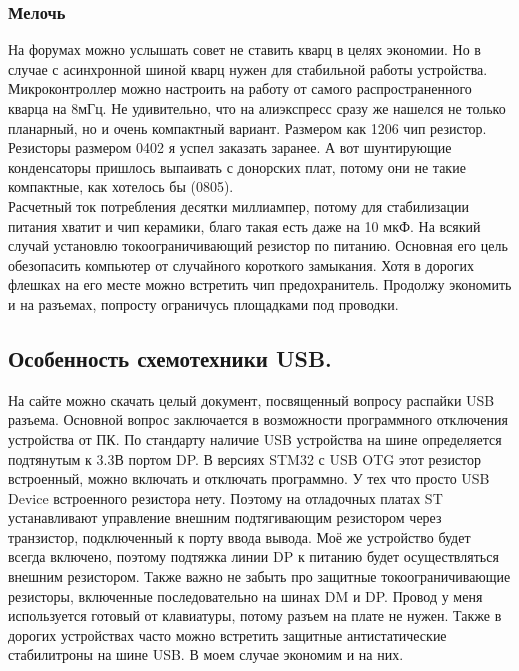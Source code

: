 \documentclass[12pt,a4paper]{article}
\begin{document}
\subsubsection{Мелочь}
    На форумах можно услышать совет не ставить кварц в целях экономии. Но
    в случае с асинхронной шиной кварц нужен для
    стабильной работы устройства. Микроконтроллер можно настроить на работу от
    самого распространенного кварца на 8мГц. Не удивительно, что на алиэкспресс
    сразу же нашелся не только планарный, но и очень компактный вариант.
    Размером как 1206 чип резистор. \\
    Резисторы размером 0402 я успел заказать заранее. А вот шунтирующие
    конденсаторы пришлось выпаивать с донорских плат, потому они не такие
    компактные, как хотелось бы (0805). \\
    Расчетный ток потребления десятки миллиампер, потому для стабилизации
    питания хватит и чип керамики, благо такая есть даже на 10 мкФ.
    На всякий случай установлю токоограничивающий резистор по питанию.
    Основная его цель обезопасить компьютер от случайного короткого замыкания.
    Хотя в дорогих флешках на его месте можно встретить чип предохранитель.
    Продолжу экономить и на разъемах, попросту ограничусь площадками под
    проводки.

\subsection{Особенность схемотехники USB.}
    На сайте можно скачать целый документ, посвященный вопросу распайки USB
    разъема. Основной вопрос заключается в возможности программного отключения
    устройства от ПК. По стандарту наличие USB устройства на шине определяется
    подтянутым к 3.3В портом DP. В версиях STM32 с USB OTG этот резистор
    встроенный, можно включать и отключать программно. У тех что просто USB
    Device встроенного резистора нету. Поэтому на отладочных платах ST
    устанавливают управление внешним подтягивающим резистором через транзистор,
    подключенный к порту ввода вывода. Моё же устройство будет всегда включено,
    поэтому подтяжка линии DP к питанию будет осуществляться внешним резистором.
    Также важно не забыть про защитные токоограничивающие резисторы, включенные
    последовательно на шинах DM и DP. Провод у меня используется
    готовый от клавиатуры, потому разъем на плате не нужен. Также в дорогих
    устройствах часто можно встретить защитные антистатические стабилитроны на
    шине USB. В моем случае экономим и на них.
\end{document}
